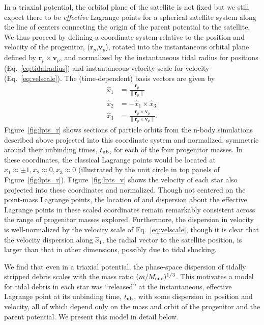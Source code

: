 \documentclass[letterpaper,12pt,preprint]{aastex}
\newcommand{\bs}{\boldsymbol}
\newcommand{\tub}{t_{\rm ub}}
\begin{document}
In a triaxial potential, the orbital plane of the satellite is not fixed but we still expect there to be \emph{effective} Lagrange points for a spherical satellite system along the line of centers connecting the origin of the parent potential to the satellite. We thus proceed by defining a coordinate system relative to the position and velocity of the progenitor, ($\bs{r}_p$,$\bs{v}_p$), rotated into the instantaneous orbital plane defined by $\bs{r}_p \times \bs{v}_p$, and normalized by the instantaneous tidal radius for positions (Eq.~\ref{eq:tidalradius}) and instantaneous velocity scale for velocity (Eq.~\ref{eq:velscale}). 
The (time-dependent) basis vectors are given by
\begin{align}
	\hat{x}_1 &= \frac{\bs{r}_p}{\|\bs{r}_p\|}\\
	\hat{x}_2 &= -\hat{x}_1 \times \hat{x}_3\\
	\hat{x}_3 &= \frac{\bs{r}_p \times \bs{v}_p}{\|\bs{r}_p \times \bs{v}_p\|}.
\end{align}
Figure~\ref{fig:lpts_r} shows sections of particle orbits from the n-body simulations described above projected into this coordinate system and normalized, symmetric around their unbinding times, $\tub$, for each of the four progenitor masses. In these coordinates, the classical Lagrange points would be located at $x_1\approx\pm1,x_2\approx0,x_3\approx0$ (illustrated by the unit circle in top panels of Figure~\ref{fig:lpts_r}). Figure~\ref{fig:lpts_v} shows the velocity of each star also projected into these coordinates and normalized. Though not centered on the point-mass Lagrange points, the location of and dispersion about the effective Lagrange points in these scaled coordinates remain remarkably consistent across the range of progenitor masses explored. Furthermore, the dispersion in velocity is well-normalized by the velocity scale of Eq.~\ref{eq:velscale}, though it is clear that the velocity dispersion along $\hat{x}_1$, the radial vector to the satellite position, is larger than that in other dimensions, possibly due to tidal shocking. 

We find that even in a triaxial potential, the phase-space dispersion of tidally stripped debris scales with the mass ratio $(m / M_{\rm enc})^{1/3}$. This motivates a model for tidal debris in each star was ``released'' at the instantaneous, effective Lagrange point at its unbinding time, $\tub$, with some dispersion in position and velocity, all of which depend only on the mass and orbit of the progenitor and the parent potential. We present this model in detail below.
\end{document}
